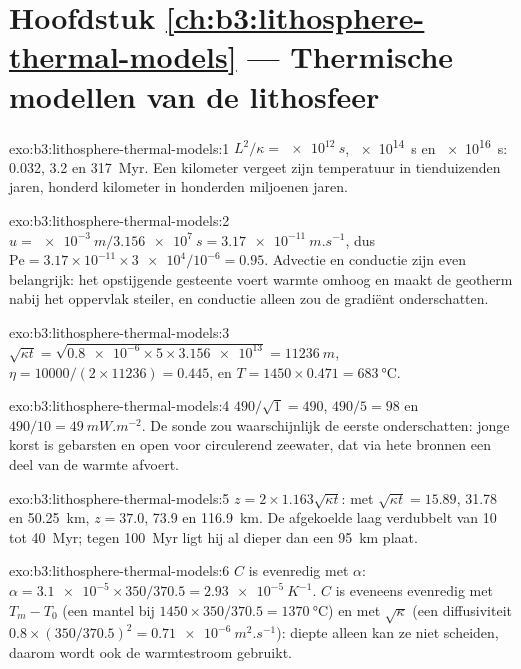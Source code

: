 \section*{Hoofdstuk \ref{ch:b3:lithosphere-thermal-models} --- Thermische modellen van de lithosfeer}

\begin{solution}{exo:b3:lithosphere-thermal-models:1}
$L^2/\kappa = \qty{e12}{s}$, \qty{e14}{s} en \qty{e16}{s}: 0.032, 3.2 en
\qty{317}{Myr}. Een kilometer vergeet zijn temperatuur in tienduizenden
jaren, honderd kilometer in honderden miljoenen jaren.
\end{solution}

\begin{solution}{exo:b3:lithosphere-thermal-models:2}
$u = \qty{e-3}{m}/\qty{3.156e7}{s} = \qty{3.17e-11}{m.s^{-1}}$, dus
$\mathrm{Pe} = 3.17\times10^{-11}\times\num{3e4}/10^{-6} = 0.95$. Advectie en
conductie zijn even belangrijk: het opstijgende gesteente voert warmte omhoog
en maakt de geotherm nabij het oppervlak steiler, en conductie alleen zou
de gradiënt onderschatten.
\end{solution}

\begin{solution}{exo:b3:lithosphere-thermal-models:3}
$\sqrt{\kappa t} = \sqrt{\num{0.8e-6}\times5\times\num{3.156e13}} =
\qty{11236}{m}$, $\eta = 10000/(2\times11236) = 0.445$, en $T = 1450\times0.471
= \qty{683}{\celsius}$.
\end{solution}

\begin{solution}{exo:b3:lithosphere-thermal-models:4}
$490/\sqrt1 = 490$, $490/5 = 98$ en $490/10 = \qty{49}{mW.m^{-2}}$. De sonde
zou waarschijnlijk de eerste onderschatten: jonge korst is gebarsten en open voor
circulerend zeewater, dat via hete bronnen een deel van de warmte afvoert.
\end{solution}

\begin{solution}{exo:b3:lithosphere-thermal-models:5}
$z = 2\times1.163\sqrt{\kappa t}$: met $\sqrt{\kappa t} = 15.89$, 31.78 en
\qty{50.25}{km}, $z = 37.0$, 73.9 en \qty{116.9}{km}. De afgekoelde laag verdubbelt
van 10 tot \qty{40}{Myr}; tegen \qty{100}{Myr} ligt hij al dieper dan een
\qty{95}{km} plaat.
\end{solution}

\begin{solution}{exo:b3:lithosphere-thermal-models:6}
$C$ is evenredig met $\alpha$: $\alpha = \num{3.1e-5}\times350/370.5 =
\qty{2.93e-5}{K^{-1}}$. $C$ is eveneens evenredig met $T_m - T_0$ (een mantel bij
$1450\times350/370.5 = \qty{1370}{\celsius}$) en met $\sqrt\kappa$ (een
diffusiviteit $0.8\times(350/370.5)^2 = \qty{0.71e-6}{m^2.s^{-1}}$): diepte alleen
kan ze niet scheiden, daarom wordt ook de warmtestroom gebruikt.
\end{solution}

